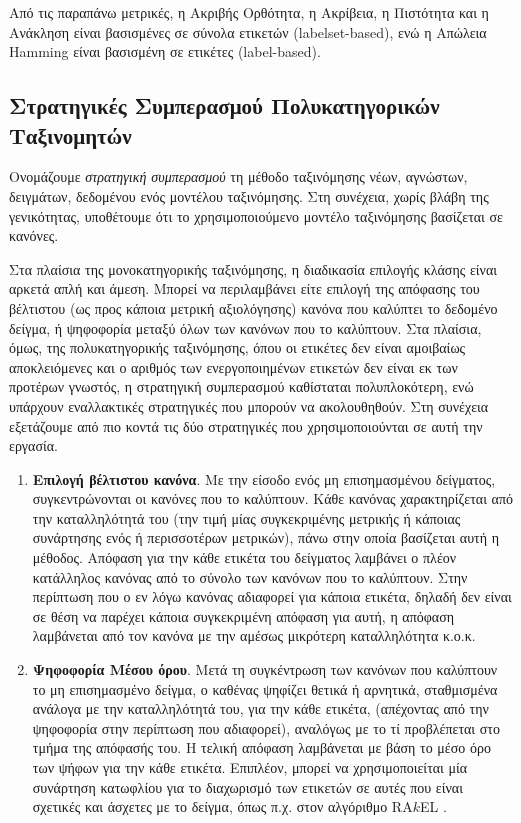 Από τις παραπάνω μετρικές, η Ακριβής Ορθότητα, η Ακρίβεια, η Πιστότητα και η Ανάκληση είναι βασισμένες σε σύνολα ετικετών (labelset-based), ενώ η Απώλεια Hamming είναι βασισμένη σε ετικέτες (label-based).

 
\subsection{Στρατηγικές Συμπερασμού Πολυκατηγορικών Ταξινομητών}
\label{subsec:multiLabelInference}
Ονομάζουμε \textit{στρατηγική συμπερασμού} τη μέθοδο ταξινόμησης νέων, αγνώστων, δειγμάτων, δεδομένου ενός μοντέλου ταξινόμησης. Στη συνέχεια, χωρίς βλάβη της γενικότητας, υποθέτουμε ότι το χρησιμοποιούμενο μοντέλο ταξινόμησης βασίζεται σε κανόνες. 

Στα πλαίσια της μονοκατηγορικής ταξινόμησης, η διαδικασία επιλογής κλάσης είναι αρκετά απλή και άμεση. Μπορεί να περιλαμβάνει είτε επιλογή της απόφασης του βέλτιστου (ως προς κάποια μετρική αξιολόγησης) κανόνα που καλύπτει το δεδομένο δείγμα, ή ψηφοφορία μεταξύ όλων των κανόνων που το καλύπτουν. Στα πλαίσια, όμως, της πολυκατηγορικής ταξινόμησης, όπου οι ετικέτες δεν είναι αμοιβαίως αποκλειόμενες και ο αριθμός των ενεργοποιημένων ετικετών δεν είναι εκ των προτέρων γνωστός, η στρατηγική συμπερασμού καθίσταται πολυπλοκότερη, ενώ υπάρχουν εναλλακτικές στρατηγικές που μπορούν να ακολουθηθούν. Στη συνέχεια εξετάζουμε από πιο κοντά τις δύο στρατηγικές που χρησιμοποιούνται σε αυτή την εργασία.

\begin{enumerate}
\item \textbf{Επιλογή βέλτιστου κανόνα}. Με την είσοδο ενός μη επισημασμένου δείγματος, συγκεντρώνονται οι κανόνες που το καλύπτουν. Κάθε κανόνας χαρακτηρίζεται από την καταλληλότητά του (την τιμή μίας συγκεκριμένης μετρικής ή κάποιας συνάρτησης ενός ή περισσοτέρων μετρικών), πάνω στην οποία βασίζεται αυτή η μέθοδος. Απόφαση για την κάθε ετικέτα του δείγματος λαμβάνει ο πλέον κατάλληλος κανόνας από το σύνολο των κανόνων που το καλύπτουν. Στην περίπτωση που ο εν λόγω κανόνας αδιαφορεί για κάποια ετικέτα, δηλαδή δεν είναι σε θέση να παρέχει κάποια συγκεκριμένη απόφαση για αυτή, η απόφαση λαμβάνεται από τον κανόνα με την αμέσως μικρότερη καταλληλότητα κ.ο.κ.
\item \textbf{Ψηφοφορία Μέσου όρου}. Μετά τη συγκέντρωση των κανόνων που καλύπτουν το μη επισημασμένο δείγμα, ο καθένας ψηφίζει θετικά ή αρνητικά, σταθμισμένα ανάλογα με την καταλληλότητά του, για την κάθε ετικέτα, (απέχοντας από την ψηφοφορία στην περίπτωση που αδιαφορεί), αναλόγως με το τί προβλέπεται στο τμήμα της απόφασής του. Η τελική απόφαση λαμβάνεται με βάση το μέσο όρο των ψήφων για την κάθε ετικέτα. Επιπλέον, μπορεί να χρησιμοποιείται μία συνάρτηση κατωφλίου για το διαχωρισμό των ετικετών σε αυτές που είναι σχετικές και άσχετες με το δείγμα, όπως π.χ. στον αλγόριθμο RA$k$EL \cite{tsoumakas2007random}.
\end{enumerate}

